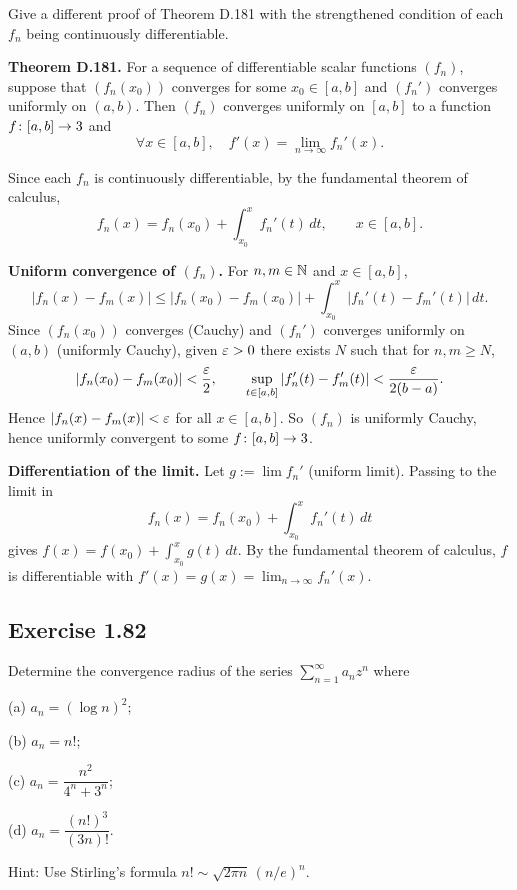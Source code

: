 \documentclass{article}
\begin{document}
Give a different proof of Theorem D.181 with the
strengthened condition of each $f_n$ being continuously
differentiable.

\textbf{Theorem D.181.}
For a sequence of differentiable scalar functions $(f_n)$,
suppose that $(f_n(x_0))$ converges for some $x_0 \in [a,b]$
and $(f_n')$ converges uniformly on $(a,b)$.
Then $(f_n)$ converges uniformly on $[a,b]$ to a function
$f \colon [a,b] \to 3$ and
\[
  \forall x \in [a,b],\quad f'(x) = \lim_{n \to \infty} f_n'(x).
\]

\begin{solution}
  Since each $f_n$ is continuously differentiable, by the
  fundamental theorem of calculus,
  \[
    f_n(x) = f_n(x_0) + \int_{x_0}^x f_n'(t)\,dt,
    \qquad x \in [a,b].
  \]

  \textbf{Uniform convergence of $(f_n)$.}\;
  For $n, m \in \mathbb{N}$ and $x \in [a,b]$,
  \[
    |f_n(x) - f_m(x)|
    \le |f_n(x_0) - f_m(x_0)|
    + \int_{x_0}^x |f_n'(t) - f_m'(t)|\,dt.
  \]
  Since $(f_n(x_0))$ converges (Cauchy) and $(f_n')$ converges
  uniformly on $(a,b)$ (uniformly Cauchy), given $\varepsilon > 0$
  there exists $N$ such that for $n,m \ge N$,
  \[
    |f_n(x_0) - f_m(x_0)| < \frac{\varepsilon}{2},
    \qquad
    \sup_{t \in [a,b]} |f_n'(t) - f_m'(t)|
    < \frac{\varepsilon}{2(b-a)}.
  \]
  Hence $|f_n(x) - f_m(x)| < \varepsilon$ for all $x \in [a,b]$.
  So $(f_n)$ is uniformly Cauchy, hence uniformly convergent
  to some $f \colon [a,b] \to 3$.

  \textbf{Differentiation of the limit.}\;
  Let $g := \lim f_n'$ (uniform limit).  Passing to the limit in
  \[
    f_n(x) = f_n(x_0) + \int_{x_0}^x f_n'(t)\,dt
  \]
  gives $f(x) = f(x_0) + \int_{x_0}^x g(t)\,dt$.
  By the fundamental theorem of calculus, $f$ is differentiable
  with $f'(x) = g(x) = \lim_{n\to\infty} f_n'(x)$.\qedhere
\end{solution}

\subsection{Exercise 1.82}

Determine the convergence radius of the series
$\sum_{n=1}^{\infty} a_n z^n$ where

(a) $a_n = (\log n)^2$;

(b) $a_n = n!$;

(c) $a_n = \dfrac{n^2}{4^n + 3^n}$;

(d) $a_n = \dfrac{(n!)^3}{(3n)!}$.

Hint: Use Stirling's formula
$n! \sim \sqrt{2\pi n}\,(n/e)^n$.
\end{document}
